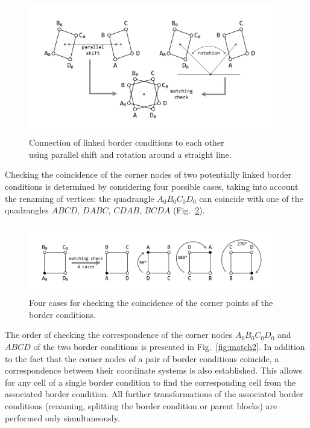 \documentclass[
11pt,%
tightenlines,%
twoside,%
onecolumn,%
nofloats,%
nobibnotes,%
nofootinbib,%
superscriptaddress,%
noshowpacs,%
centertags]%
{revtex4}
\begin{document}
\begin{figure}[h]
\setcaptionmargin{5mm}
\onelinecaptionsfalse
\includegraphics[width=0.95\textwidth]{pics/match3.pdf}
\caption{Connection of linked border conditions to each other \\ using parallel shift and rotation around a straight line.}
\label{fig:match3}
\end{figure}

Checking the coincidence of the corner nodes of two potentially linked border conditions is determined by considering four possible cases, taking into account the renaming of vertices: the quadrangle $A_0B_0C_0D_0$ can coincide with one of the quadrangles $ABCD$, $DABC$, $CDAB$, $BCDA$ (Fig.~\ref{fig:match}).

\begin{figure}[h]
\setcaptionmargin{5mm}
\onelinecaptionstrue
\includegraphics[width=0.95\textwidth]{pics/match.pdf}
\caption{Four cases for checking the coincidence of the corner points of the border conditions.}
\label{fig:match}
\end{figure}

The order of checking the correspondence of the corner nodes $A_0B_0C_0D_0$ and $ABCD$ of the two border conditions is presented in Fig.~\ref{fig:match2}.
In addition to the fact that the corner nodes of a pair of border conditions coincide, a correspondence between their coordinate systems is also established.
This allows for any cell of a single border condition to find the corresponding cell from the associated border condition.
All further transformations of the associated border conditions (renaming, splitting the border condition or parent blocks) are performed only simultaneously.
\end{document}
